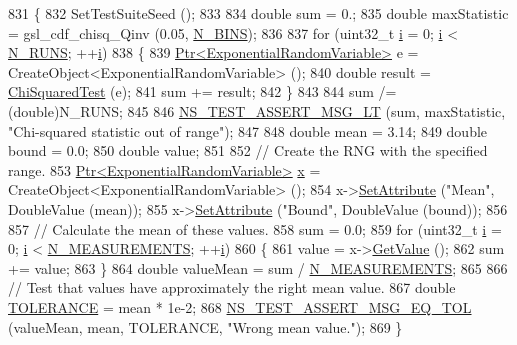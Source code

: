 \begin{DoxyCode}
831 \{
832   SetTestSuiteSeed ();
833 
834   \textcolor{keywordtype}{double} sum = 0.;
835   \textcolor{keywordtype}{double} maxStatistic = gsl\_cdf\_chisq\_Qinv (0.05, \hyperlink{classRandomVariableStreamExponentialTestCase_acc59b9e97c80683bdc06ffe237ab5339}{N\_BINS});
836 
837   \textcolor{keywordflow}{for} (uint32\_t \hyperlink{bernuolliDistribution_8m_a6f6ccfcf58b31cb6412107d9d5281426}{i} = 0; \hyperlink{bernuolliDistribution_8m_a6f6ccfcf58b31cb6412107d9d5281426}{i} < \hyperlink{classRandomVariableStreamExponentialTestCase_a069ef5f86a9882cdd7cc6c4c281825ee}{N\_RUNS}; ++\hyperlink{bernuolliDistribution_8m_a6f6ccfcf58b31cb6412107d9d5281426}{i})
838     \{
839       \hyperlink{classns3_1_1Ptr}{Ptr<ExponentialRandomVariable>} e = 
      CreateObject<ExponentialRandomVariable> ();
840       \textcolor{keywordtype}{double} result = \hyperlink{classRandomVariableStreamExponentialTestCase_a2613351abbb33f766dd36dc2e9bfde62}{ChiSquaredTest} (e);
841       sum += result;
842     \}
843 
844   sum /= (double)N\_RUNS;
845 
846   \hyperlink{group__testing_ga1d96848b91407c9a0b36583e8b0ad7ae}{NS\_TEST\_ASSERT\_MSG\_LT} (sum, maxStatistic, \textcolor{stringliteral}{"Chi-squared statistic out of range"});
847 
848   \textcolor{keywordtype}{double} mean = 3.14;
849   \textcolor{keywordtype}{double} bound = 0.0;
850   \textcolor{keywordtype}{double} value;
851 
852   \textcolor{comment}{// Create the RNG with the specified range.}
853   \hyperlink{classns3_1_1Ptr}{Ptr<ExponentialRandomVariable>} \hyperlink{lte__link__budget__x2__handover__measures_8m_a9336ebf25087d91c818ee6e9ec29f8c1}{x} = CreateObject<ExponentialRandomVariable>
       ();
854   x->\hyperlink{classns3_1_1ObjectBase_ac60245d3ea4123bbc9b1d391f1f6592f}{SetAttribute} (\textcolor{stringliteral}{"Mean"}, DoubleValue (mean));
855   x->\hyperlink{classns3_1_1ObjectBase_ac60245d3ea4123bbc9b1d391f1f6592f}{SetAttribute} (\textcolor{stringliteral}{"Bound"}, DoubleValue (bound));
856 
857   \textcolor{comment}{// Calculate the mean of these values.}
858   sum = 0.0;
859   \textcolor{keywordflow}{for} (uint32\_t \hyperlink{bernuolliDistribution_8m_a6f6ccfcf58b31cb6412107d9d5281426}{i} = 0; \hyperlink{bernuolliDistribution_8m_a6f6ccfcf58b31cb6412107d9d5281426}{i} < \hyperlink{classRandomVariableStreamExponentialTestCase_ade203b10972a628c493cc521e58a0e49}{N\_MEASUREMENTS}; ++\hyperlink{bernuolliDistribution_8m_a6f6ccfcf58b31cb6412107d9d5281426}{i})
860     \{
861       value = x->\hyperlink{classns3_1_1ExponentialRandomVariable_a5d7a50466c0b0f036ec0fc1aa478f2c3}{GetValue} ();
862       sum += value;
863     \}
864   \textcolor{keywordtype}{double} valueMean = sum / \hyperlink{classRandomVariableStreamExponentialTestCase_ade203b10972a628c493cc521e58a0e49}{N\_MEASUREMENTS};
865 
866   \textcolor{comment}{// Test that values have approximately the right mean value.}
867   \textcolor{keywordtype}{double} \hyperlink{spectrum-value-test_8cc_a30c17564229ec2e37dfea9c6c9ad643e}{TOLERANCE} = mean * 1e-2;
868   \hyperlink{group__testing_ga9e7861b56b4e70db3b56044cb7a28e41}{NS\_TEST\_ASSERT\_MSG\_EQ\_TOL} (valueMean, mean, TOLERANCE, \textcolor{stringliteral}{"Wrong mean value."}); 
869 \}
\end{DoxyCode}



